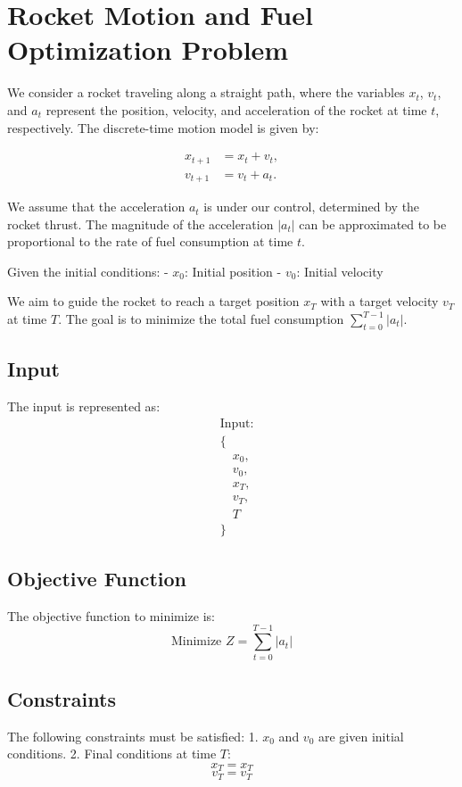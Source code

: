 \documentclass{article}
\begin{document}
\section*{Rocket Motion and Fuel Optimization Problem}

We consider a rocket traveling along a straight path, where the variables \( x_t \), \( v_t \), and \( a_t \) represent the position, velocity, and acceleration of the rocket at time \( t \), respectively. 
The discrete-time motion model is given by:

\begin{align*}
    x_{t+1} &= x_t + v_t, \\
    v_{t+1} &= v_t + a_t.
\end{align*}

We assume that the acceleration \( a_t \) is under our control, determined by the rocket thrust. The magnitude of the acceleration \( |a_t| \) can be approximated to be proportional to the rate of fuel consumption at time \( t \).

Given the initial conditions:
- \( x_0 \): Initial position
- \( v_0 \): Initial velocity

We aim to guide the rocket to reach a target position \( x_T \) with a target velocity \( v_T \) at time \( T \). The goal is to minimize the total fuel consumption \( \sum_{t=0}^{T-1} |a_t| \).

\subsection*{Input}
The input is represented as:
\[
\begin{align*}
    &\text{Input:} \\
    &\{ \\
    &\quad x_0, \\
    &\quad v_0, \\
    &\quad x_T, \\
    &\quad v_T, \\
    &\quad T \\
    &\}
\end{align*}
\]

\subsection*{Objective Function}
The objective function to minimize is:
\[
\text{Minimize } Z = \sum_{t=0}^{T-1} |a_t|
\]

\subsection*{Constraints}
The following constraints must be satisfied:
1. \( x_0 \) and \( v_0 \) are given initial conditions.
2. Final conditions at time \( T \):
   \[
   x_T = x_T
   \]
   \[
   v_T = v_T
   \]
\end{document}
